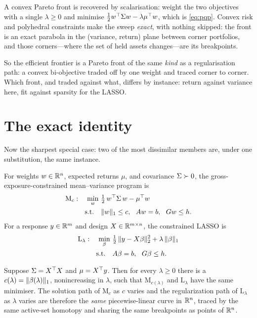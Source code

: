 A convex Pareto front is recovered by scalarisation: weight the two objectives with a
single $\lambda \ge 0$ and minimise $\tfrac12 w^{\top}\Sigma w - \lambda\mu^{\top} w$, which is
\eqref{eq:pqp}. Convex risk and polyhedral constraints make the sweep \emph{exact},
with nothing skipped: the front is an exact parabola in the
(variance, return) plane between corner portfolios, and those corners---where the set
of held assets changes---are its breakpoints.

So the efficient frontier is a Pareto front of the same \emph{kind} as a
regularisation path: a convex bi-objective traded off by one weight and traced corner
to corner. Which front, and traded against what, differs by instance: return against
variance here, fit against sparsity for the LASSO.

\section{The exact identity}
\label{sec:identity}

Now the sharpest special case: two of the most dissimilar members are, under one
substitution, the same instance.

For weights $w \in \mathbb{R}^n$, expected returns $\mu$, and covariance $\Sigma \succ 0$, the
gross-exposure-constrained mean--variance program is
\begin{equation}
\label{eq:mark}
\begin{aligned}
\mathrm{M}_c:\quad \min_{w}\ &\tfrac12\, w^{\top} \Sigma\, w - \mu^{\top} w \\
\text{s.t.}\quad &\lVert w \rVert_1 \le c,\ \ A w = b,\ \ G w \le h .
\end{aligned}
\end{equation}
For a response $y \in \mathbb{R}^m$ and design $X \in \mathbb{R}^{m\times n}$, the constrained LASSO
is
\begin{equation}
\label{eq:lasso}
\begin{aligned}
\mathrm{L}_\lambda:\quad \min_{\beta}\ &\tfrac12\,\lVert y - X\beta \rVert_2^2 + \lambda\,\lVert \beta \rVert_1 \\
\text{s.t.}\quad &A\beta = b,\ \ G\beta \le h .
\end{aligned}
\end{equation}

\begin{theorem}
\label{thm:identity}
Suppose $\Sigma = X^{\top} X$ and $\mu = X^{\top} y$. Then for every $\lambda \ge 0$ there is a
$c(\lambda) = \lVert \beta(\lambda) \rVert_1$, nonincreasing in $\lambda$, such that
$\mathrm{M}_{c(\lambda)}$ and $\mathrm{L}_\lambda$ have the same minimiser. The
solution path of $\mathrm{M}_c$ as $c$ varies and the regularization path of
$\mathrm{L}_\lambda$ as $\lambda$ varies are therefore the \emph{same}
piecewise-linear curve in $\mathbb{R}^n$, traced by the same active-set homotopy and sharing
the same breakpoints as points of $\mathbb{R}^n$.
\end{theorem}

